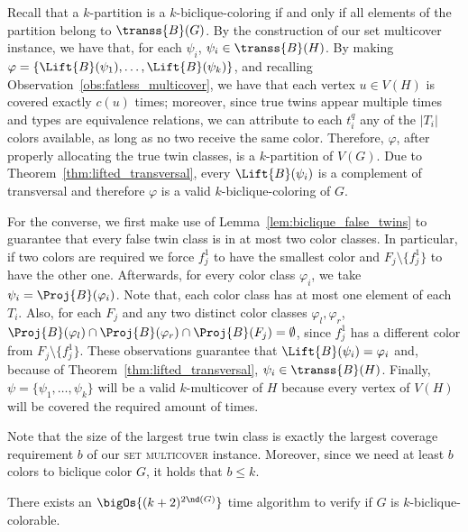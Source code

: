 \begin{tproof}
    Recall that a $k$-partition is a $k$-biclique-coloring if and only if all elements of the partition belong to $\transs{B}(G)$. By the construction of our set multicover instance, we have that, for each $\psi_i$, $\psi_i \in \transs{B}(H)$. By making $\varphi = \left\{\Lift{B}(\psi_1), \dots, \Lift{B}(\psi_k)\right\}$, and recalling Observation~\ref{obs:fatless_multicover}, we have that each vertex $u \in V(H)$ is covered exactly $c(u)$ times; moreover, since true twins appear multiple times and types are equivalence relations, we can attribute to each $t_i^q$ any of the $|T_i|$ colors available, as long as no two receive the same color.
    Therefore, $\varphi$, after properly allocating the true twin classes, is a $k$-partition of $V(G)$.
    Due to Theorem~\ref{thm:lifted_transversal}, every $\Lift{B}(\psi_i)$ is a complement of transversal and therefore $\varphi$ is a valid $k$-biclique-coloring of $G$.
    
    For the converse, we first make use of Lemma~\ref{lem:biclique_false_twins} to guarantee that every false twin class is in at most two color classes. In particular, if two colors are required we force $f_j^1$ to have the smallest color and $F_j \setminus \{f_j^1\}$ to have the other one.
    Afterwards, for every color class $\varphi_i$, we take $\psi_i = \Proj{B}(\varphi_i)$.
    Note that, each color class has at most one element of each $T_i$. Also, for each $F_j$ and any two distinct color classes $\varphi_l, \varphi_r$, $\Proj{B}(\varphi_l) \cap \Proj{B}(\varphi_r) \cap \Proj{B}(F_j) = \emptyset$, since $f_j^1$ has a different color from $F_j \setminus \{f_j^1\}$.
    These observations guarantee that $\Lift{B}(\psi_i) = \varphi_i$ and, because of Theorem~\ref{thm:lifted_transversal}, $\psi_i \in \transs{B}(H)$.
    Finally, $\psi = \{\psi_1, \dots, \psi_k\}$ will be a valid $k$-multicover of $H$ because every vertex of $V(H)$ will be covered the required amount of times.
\end{tproof}

Note that the size of the largest true twin class is exactly the largest coverage requirement $b$ of our \textsc{set multicover} instance. Moreover, since we need at least $b$ colors to biclique color $G$, it holds that $b \leq k$.

\begin{theorem}
    \label{thm:fpt_biclique}
    There exists an $\bigOs{(k+2)^{2\nd(G)}}$ time algorithm to verify if $G$ is $k$-biclique-colorable.
\end{theorem}

